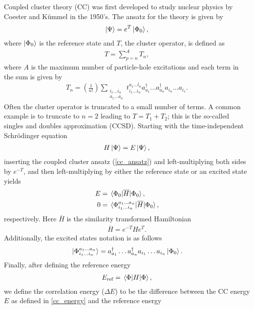 \documentclass[10pt]{article}
\begin{document}
Coupled cluster theory (CC) was first developed to study nuclear physics by Coester and K\"{u}mmel \cite{coupled_cluster_theory} in the 1950's. The ansatz for the theory is given by
\begin{align}
\label{cc_ansatz}
\ket{\Psi}=e^T\ket{\Phi_0},
\end{align}
where $\ket{\Phi_0}$ is the reference state and $T$, the cluster operator, is defined as
\begin{align}
\label{cluster_op_def}
T = \sum_{p=n}^AT_n,
\end{align}
where $A$ is the maximum number of particle-hole excitations and each term in the sum is given by
\begin{align}
T_n=\left(\frac{1}{n!}\right)\sum_{\substack{i_1\ldots i_n \\ a_1\ldots a_n}}t_{i_1\ldots i_n}^{a_1\ldots l_n}a^\dagger_{a_1}\ldots a^\dagger_{a_n}a_{i_n}\ldots a_{i_1}.
\end{align}
Often the cluster operator is truncated to a small number of terms. A common example is to truncate to $n=2$ leading to $T=T_1+T_2$; this is the so-called singles and doubles approximation (CCSD).
Starting with the time-independent Schr\"{o}dinger equation \begin{align}
H\ket{\Psi}=E\ket{\Psi},
\end{align}
inserting the coupled cluster ansatz (\ref{cc_ansatz}) and left-multiplying both sides by $e^{-T}$, and then left-multiplying by either the reference state or an excited state yields
\begin{align}
\label{cc_energy} 
E&=\mel{\Phi_0}{\overline{H}}{\Phi_0},
\\
\label{cc_eq}
0&=\mel*{\Phi^{a_1\ldots a_n}_{i_1\ldots i_n}}{\overline{H}}{\Phi_0},
\end{align}
respectively. Here $\bar{H}$ is the similarity transformed Hamiltonian
\begin{align}
\label{sim_H}
\overline{H}
=
e^{-T}He^T.
\end{align}
Additionally, the excited states notation is as follows
\begin{align}
\ket*{\Phi^{a_1\ldots a_n}_{i_1\ldots i_n}}
=
a^\dagger_{a_1}\ldots a^\dagger_{a_n}
a_{i_1}\ldots a_{i_n}
\ket{\Phi_0}.
\end{align}
Finally, after defining the reference energy
\begin{align}
E_{\text{ref}}=\mel{\Phi}{H}{\Phi},
\end{align}
we define the correlation energy ($\Delta E$) to be the difference between the CC energy $E$ as defined in \ref{cc_energy} and the reference energy
\end{document}
